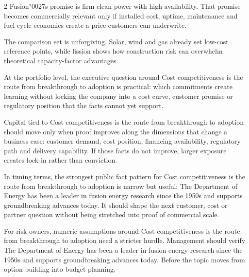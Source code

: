 \documentclass[10pt,a4paper]{article}
\newcommand{\BOApos}{{\BOQuoteFont\char"0027}}
\begin{document}
\begin{multicols}{2}
{\small Fusion\BOApos{}s promise is firm clean power with high availability. That promise becomes commercially relevant only if installed cost, uptime, maintenance and fuel-cycle economics create a price customers can underwrite.}\par
{\small The comparison set is unforgiving. Solar, wind and gas already set low-cost reference points, while fission shows how construction risk can overwhelm theoretical capacity-factor advantages.}\par
{\small At the portfolio level, the executive question around Cost competitiveness is the route from breakthrough to adoption is practical: which commitments create learning without locking the company into a cost curve, customer promise or regulatory position that the facts cannot yet support.}\par
{\small Capital tied to Cost competitiveness is the route from breakthrough to adoption should move only when proof improves along the dimensions that change a business case: customer demand, cost position, financing availability, regulatory path and delivery capability. If those facts do not improve, larger exposure creates lock-in rather than conviction.}\par
{\small In timing terms, the strongest public fact pattern for Cost competitiveness is the route from breakthrough to adoption is narrow but useful: The Department of Energy has been a leader in fusion energy research since the 1950s and supports groundbreaking advances today. It should shape the next customer, cost or partner question without being stretched into proof of commercial scale.}\par
{\small For risk owners, numeric assumptions around Cost competitiveness is the route from breakthrough to adoption need a stricter hurdle. Management should verify The Department of Energy has been a leader in fusion energy research since the 1950s and supports groundbreaking advances today. Before the topic moves from option building into budget planning.}\par
\end{multicols}
\label{chap:6:end}
\end{document}

